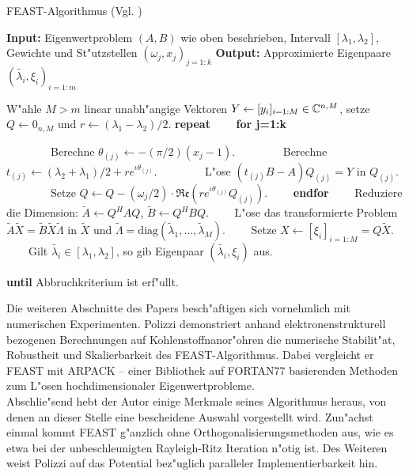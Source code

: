 \newpage

\begin{algorithm}
\caption{FEAST-Algorithmus (Vgl. \cite[Abschnitt III]{polizzi})}\label{alg:chap4:feast}
\textbf{Input:} Eigenwertproblem $(A,B)$ wie oben beschrieben, Intervall $[\lambda_1,\lambda_2]$, Gewichte und St"utzstellen $(\omega_j, x_j)_{j=1:k}$
\textbf{Output:} Approximierte Eigenpaare $(\widetilde{\lambda_i},\xi_i)_{i=1:m}$
\begin{algorithmic}[1]
\State W"ahle $M > m$ linear unabh"angige Vektoren $Y \gets [y_i]_{i=1:M} \in\mathbb{C}^{n,M}$, setze $Q\gets 0_{n,M}$ und $r\gets (\lambda_1 - \lambda_2)/2$.
\State \textbf{repeat}
\State \ \ \ \ \textbf{for j=1:k}

\State \ \ \ \ \ \ \ \ Berechne $\theta_{(j)} \gets -(\pi/2)(x_j-1)$.
\State \ \ \ \ \ \ \ \ Berechne $t_{(j)} \gets (\lambda_2 + \lambda_1)/2 + re^{\iota\theta_{(j)}}$.
\State \ \ \ \ \ \ \ \ L"ose $(t_{(j)} B-A)Q_{(j)} = Y$ in $Q_{(j)}$.
\State \ \ \ \ \ \ \ \ Setze $Q\gets Q - (\omega_j/2)\cdot\mathfrak{Re}\left(re^{\iota \theta_{(j)}} Q_{(j)}\right)$.
\State \ \ \ \ \textbf{endfor}
\State \ \ \ \ Reduziere die Dimension: $\widetilde{A} \gets Q^H A Q$,
$\widetilde{B} \gets Q^H B Q$.
\State \ \ \ \ L"ose das transformierte Problem $\widetilde{A}\widetilde{X}
= \widetilde{B}\widetilde{X}\widetilde{\Lambda}$ in
$\widetilde{X}$ und $\widetilde{\Lambda} = \text{diag}(\widetilde{\lambda}_1,\ldots,\widetilde{\lambda}_M)$.
\State \ \ \ \ Setze $X \gets [\xi_i]_{i=1:M} = Q\widetilde{X}$.
\State \ \ \ \ Gilt $\widetilde{\lambda_i} \in [\lambda_1,\lambda_2]$, so gib Eigenpaar $(\widetilde{\lambda_i},\xi_i)$ aus.

\State \textbf{until} Abbruchkriterium ist erf"ullt.
\end{algorithmic}
\end{algorithm}

Die weiteren Abschnitte des Papers besch"aftigen sich vornehmlich mit numerischen Experimenten. Polizzi demonstriert anhand elektronenstrukturell bezogenen Berechnungen auf Kohlenstoffnanor"ohren die numerische Stabilit"at, Robustheit und Skalierbarkeit des FEAST-Algorithmus. Dabei vergleicht er FEAST mit ARPACK -- einer Bibliothek auf FORTAN77 basierenden Methoden zum L"osen hochdimensionaler Eigenwertprobleme.\\

Abschlie"send hebt der Autor einige Merkmale seines Algorithmus heraus, von denen an dieser Stelle eine bescheidene Auswahl vorgestellt wird. Zun"achst einmal kommt FEAST g"anzlich ohne Orthogonalisierungsmethoden aus, wie es etwa bei der unbeschleunigten Rayleigh-Ritz Iteration n"otig ist. Des Weiteren weist Polizzi auf das Potential bez"uglich paralleler Implementierbarkeit hin.\\

